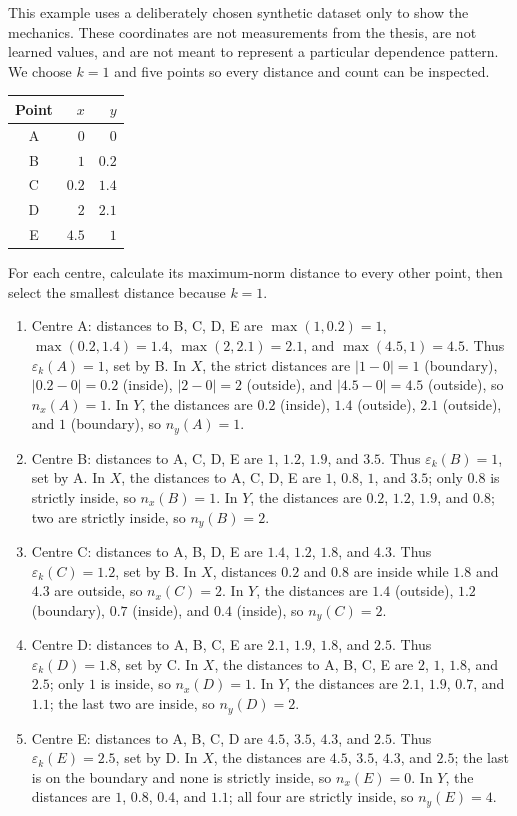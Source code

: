 \documentclass[11pt,letterpaper,oneside]{report}
\newcommand{\epsk}{\varepsilon_k}
\begin{document}
This example uses a deliberately chosen synthetic dataset only to show the mechanics. These coordinates are not measurements from the thesis, are not learned values, and are not meant to represent a particular dependence pattern. We choose $k=1$ and five points so every distance and count can be inspected.

\begin{center}
\begin{tabular}{c|rr}
\toprule
Point & $x$ & $y$\\
\midrule
A & $0$ & $0$\\
B & $1$ & $0.2$\\
C & $0.2$ & $1.4$\\
D & $2$ & $2.1$\\
E & $4.5$ & $1$\\
\bottomrule
\end{tabular}
\end{center}

For each centre, calculate its maximum-norm distance to every other point, then select the smallest distance because $k=1$.

\begin{enumerate}[label=\textbf{Point \Alph*.}]
\item Centre A: distances to B, C, D, E are $\max(1,0.2)=1$, $\max(0.2,1.4)=1.4$, $\max(2,2.1)=2.1$, and $\max(4.5,1)=4.5$. Thus $\epsk(A)=1$, set by B. In $X$, the strict distances are $|1-0|=1$ (boundary), $|0.2-0|=0.2$ (inside), $|2-0|=2$ (outside), and $|4.5-0|=4.5$ (outside), so $n_x(A)=1$. In $Y$, the distances are $0.2$ (inside), $1.4$ (outside), $2.1$ (outside), and $1$ (boundary), so $n_y(A)=1$.
\item Centre B: distances to A, C, D, E are $1$, $1.2$, $1.9$, and $3.5$. Thus $\epsk(B)=1$, set by A. In $X$, the distances to A, C, D, E are $1$, $0.8$, $1$, and $3.5$; only $0.8$ is strictly inside, so $n_x(B)=1$. In $Y$, the distances are $0.2$, $1.2$, $1.9$, and $0.8$; two are strictly inside, so $n_y(B)=2$.
\item Centre C: distances to A, B, D, E are $1.4$, $1.2$, $1.8$, and $4.3$. Thus $\epsk(C)=1.2$, set by B. In $X$, distances $0.2$ and $0.8$ are inside while $1.8$ and $4.3$ are outside, so $n_x(C)=2$. In $Y$, the distances are $1.4$ (outside), $1.2$ (boundary), $0.7$ (inside), and $0.4$ (inside), so $n_y(C)=2$.
\item Centre D: distances to A, B, C, E are $2.1$, $1.9$, $1.8$, and $2.5$. Thus $\epsk(D)=1.8$, set by C. In $X$, the distances to A, B, C, E are $2$, $1$, $1.8$, and $2.5$; only $1$ is inside, so $n_x(D)=1$. In $Y$, the distances are $2.1$, $1.9$, $0.7$, and $1.1$; the last two are inside, so $n_y(D)=2$.
\item Centre E: distances to A, B, C, D are $4.5$, $3.5$, $4.3$, and $2.5$. Thus $\epsk(E)=2.5$, set by D. In $X$, the distances are $4.5$, $3.5$, $4.3$, and $2.5$; the last is on the boundary and none is strictly inside, so $n_x(E)=0$. In $Y$, the distances are $1$, $0.8$, $0.4$, and $1.1$; all four are strictly inside, so $n_y(E)=4$.
\end{enumerate}
\end{document}
